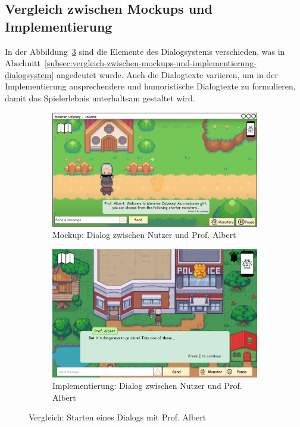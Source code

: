 \subsection{Vergleich zwischen Mockups und Implementierung}\label{subsec:vergleich-zwischen-mockups-und-implementierung-starter-monster}
In der Abbildung~\ref{fig: Vergleich: Starten eines Dialogs mit Prof. Albert} sind die Elemente des Dialogsystems verschieden, was in Abschnitt~\ref{subsec:vergleich-zwischen-mockups-und-implementierung-dialogsystem} angedeutet wurde. Auch die Dialogtexte variieren, um in der Implementierung ansprechendere und humoristische Dialogtexte zu formulieren, damit das Spielerlebnis unterhaltsam gestaltet wird.
\begin{figure}[H]
    \centering
    \begin{subfigure}[b]{0.4\textwidth}
        \includegraphics[width=\textwidth]{images/mockups/Starter/PlayerAndProfMessage}
        \caption{Mockup: Dialog zwischen Nutzer und Prof. Albert}
        \label{fig: Mockup: Dialog Nutzer und Prof. Albert}
    \end{subfigure}
    \hfill
    \begin{subfigure}[b]{0.4\textwidth}
        \includegraphics[width=\textwidth]{images/implementation/Starter/Implement dialog.png}
        \caption{Implementierung: Dialog zwischen Nutzer und Prof. Albert}
        \label{fig: Implementierung: Dialog Nutzer und Prof. Albert}
    \end{subfigure}
    \caption{Vergleich: Starten eines Dialogs mit Prof. Albert}
    \label{fig: Vergleich: Starten eines Dialogs mit Prof. Albert}
\end{figure}

